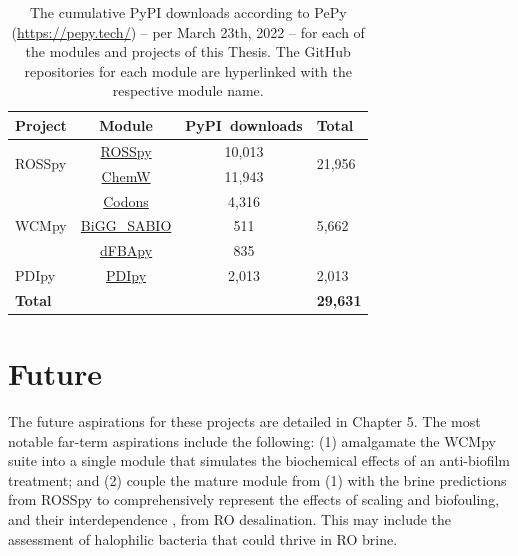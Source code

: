 \begin{table}[h]
    \centering
    \begin{tabular}{l|c|c|l}
        \textbf{Project} & \textbf{Module} & \textbf{PyPI~downloads} & \textbf{Total}\\
        \toprule
        \multirow{2}{2mm}{ROSSpy} & \href{https://github.com/freiburgermsu/ROSSpy}{ROSSpy} & 10,013 & \multirow{2}{2mm}{21,956}\\
         & \href{https://github.com/freiburgermsu/ChemW}{ChemW} & 11,943 & \\
         \hline
        \multirow{3}{2mm}{WCMpy} & \href{https://github.com/freiburgermsu/Codons}{Codons} & 4,316 & \multirow{3}{2mm}{5,662}\\
         & \href{https://github.com/freiburgermsu/BiGG_SABIO}{BiGG\_SABIO}  & 511 & \\
         & \href{https://github.com/freiburgermsu/dFBApy}{dFBApy} & 835 & \\
         \hline
        PDIpy & \href{https://github.com/freiburgermsu/PDIpy}{PDIpy} & 2,013 & 2,013\\
         \hline
         \textbf{Total} &  &  & \textbf{29,631} \\
         \bottomrule
    \end{tabular}
    \caption{
        The cumulative PyPI downloads according to PePy (\url{https://pepy.tech/}) -- per March 23th, 2022 -- for each of the modules and projects of this Thesis. The GitHub repositories for each module are hyperlinked with the respective module name. 
    }
    \label{downloads}
\end{table}


\section{Future}
The future aspirations for these projects are detailed in Chapter 5. The most notable far-term aspirations include the following: (1) amalgamate the WCMpy suite into a single module that simulates the biochemical effects of an anti-biofilm treatment; and (2) couple the mature module from (1) with the brine predictions from ROSSpy to comprehensively represent the effects of scaling and biofouling, and their interdependence \cite{Radu2014ASystems,Radu2010ModelingPassage}, from RO desalination. This may include the assessment of halophilic bacteria \cite{Bagheri2019ARuber} that could thrive in RO brine.